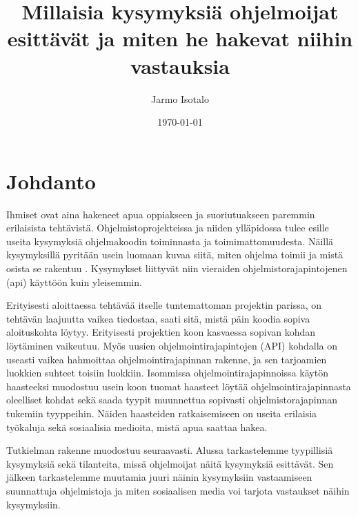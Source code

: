 \documentclass[finnish]{../tktltiki2}
\title{Millaisia kysymyksiä ohjelmoijat esittävät ja miten he hakevat niihin vastauksia}
\author{Jarmo Isotalo}
\date{\today}
\theoremstyle{definition}
\theoremstyle{remark}
\begin{document}

\frontmatter      %

\maketitle        %

\tableofcontents  %


\mainmatter       %

\section{Johdanto}
Ihmiset ovat aina hakeneet apua oppiakseen ja suoriutuakseen paremmin erilaisista tehtävistä. %
Ohjelmistoprojekteissa ja niiden ylläpidossa tulee esille useita kysymyksiä ohjelmakoodin toiminnasta ja toimimattomuudesta. Näillä kysymyksillä pyritään usein luomaan kuvaa siitä, miten ohjelma toimii ja  mistä osista se rakentuu \cite{g_search_code, questions-during-software-evolution-tasks,asking-and-answering-api-questions}.
Kysymykset liittyvät niin vieraiden ohjelmistorajapintojenen (api) käyttöön \cite{jungloid-mining} kuin yleisemmin.

Erityisesti aloittaessa tehtävää itselle tuntemattoman projektin parissa, on tehtävän laajuutta vaikea tiedostaa, saati sitä, mistä päin koodia sopiva aloituskohta löytyy. Erityisesti projektien koon kasvaessa sopivan kohdan löytäminen vaikeutuu.
Myös uusien ohjelmointirajapintojen (API) kohdalla on useasti vaikea hahmoittaa ohjelmointirajapinnan rakenne, ja sen tarjoamien luokkien suhteet toisiin luokkiin. Isommissa ohjelmointirajapinnoissa käytön haasteeksi muodostuu usein koon tuomat haasteet löytää ohjelmointirajapinnasta oleelliset kohdat sekä saada tyypit muunnettua sopivasti ohjelmistorajapinnan tukemiin tyyppeihin.
Näiden haasteiden ratkaisemiseen on useita erilaisia työkaluja sekä sosiaalisia medioita, mistä apua saattaa hakea.

Tutkielman rakenne muodostuu seuraavasti. Alussa tarkastelemme tyypillisiä kysymyksiä sekä tilanteita, missä ohjelmoijat näitä kysymyksiä esittävät. Sen jälkeen tarkastelemme muutamia juuri näinin kysymyksiin vastaamiseen suunnattuja ohjelmistoja ja miten sosiaalisen media voi tarjota vastaukset näihin kysymyksiin.
\end{document}

